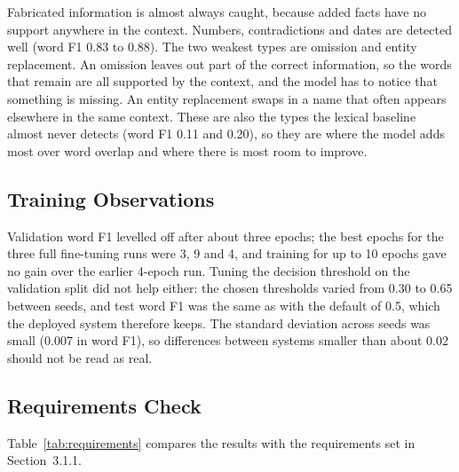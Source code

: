 Fabricated information is almost always caught, because added facts have no
support anywhere in the context. Numbers, contradictions and dates are detected
well (word F1 0.83 to 0.88). The two weakest types are omission and entity
replacement. An omission leaves out part of the correct information, so the
words that remain are all supported by the context, and the model has to
notice that something is missing. An entity replacement swaps in a name that
often appears elsewhere in the same context. These are also the types the
lexical baseline almost never detects (word F1 0.11 and 0.20), so they are where
the model adds most over word overlap and where there is most room to improve.

\subsection{Training Observations}

Validation word F1 levelled off after about three epochs; the best epochs for
the three full fine-tuning runs were 3, 9 and 4, and training for up to 10
epochs gave no gain over the earlier 4-epoch run. Tuning the decision threshold
on the validation split did not help either: the chosen thresholds varied from
0.30 to 0.65 between seeds, and test word F1 was the same as with the default
of 0.5, which the deployed system therefore keeps. The standard deviation
across seeds was small (0.007 in word F1), so differences between systems
smaller than about 0.02 should not be read as real.

\subsection{Requirements Check}

Table~\ref{tab:requirements} compares the results with the requirements set in
Section~3.1.1.

